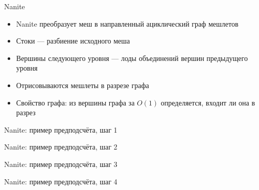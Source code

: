 \begin{frame}{Nanite}
    \begin{itemize}
        \item Nanite преобразует меш в направленный ациклический граф мешлетов
        \item Стоки --- разбиение исходного меша
        \item Вершины следующего уровня --- лоды объединений вершин предыдущего уровня
        \item Отрисовываются мешлеты в разрезе графа
        \item Свойство графа: из вершины графа за $O(1)$ определяется, входит ли она в разрез
    \end{itemize}
    \begin{center}
        
        
    \end{center}
\end{frame}

\begin{frame}{Nanite: пример предподсчёта, шаг 1}
    \centering 
\end{frame}

\begin{frame}{Nanite: пример предподсчёта, шаг 2}
    \centering 
\end{frame}

\begin{frame}{Nanite: пример предподсчёта, шаг 3}
    \centering 
\end{frame}

\begin{frame}{Nanite: пример предподсчёта, шаг 4}
    \centering 
\end{frame}
